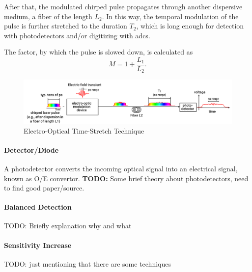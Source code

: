 After that, the modulated chirped pulse propagates through another dispersive medium, a fiber of the length $L_2$.
In this way, the temporal modulation of the pulse is further stretched to the duration $T_2$, which is long enough for detection with photodetectors and/or digitizing with \Glspl{adc}. \cite{roussel2014}

The factor, by which the pulse is slowed down, is calculated as
\begin{equation}
	M = 1 + \frac{L_1}{L_2}.
\end{equation}

\begin{figure}[tbh]
	\centering
	\includegraphics[width = \textwidth]{chap/02-theory/img/time_stretch.png}
	\caption{Electro-Optical Time-Stretch Technique \cite{szwaj}}
	\label{fig:eo_ts}
\end{figure}


\paragraph{Detector/Diode}
A photodetector converts the incoming optical signal into an electrical signal, known as O/E convertor.
\textbf{TODO:} Some brief theory about photodetectors, need to find good paper/source.

\paragraph{Balanced Detection}
TODO: Briefly explanation why and what
\paragraph{Sensitivity Increase}
TODO: just mentioning that there are some techniques

